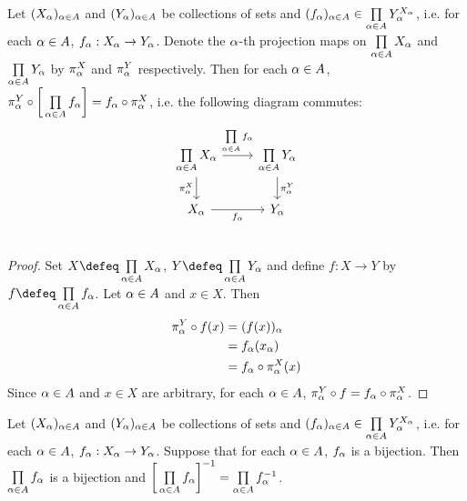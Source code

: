 \documentclass{book}
\begin{document}
	\begin{ex}  
		Let $(X_{\alpha})_{\alpha \in A}$ and $(Y_{\alpha})_{\alpha \in A}$ be collections of sets and $(f_{\alpha})_{\alpha \in A} \in \prod\limits_{\alpha \in A} Y_{\alpha}^{X_{\alpha}}$, i.e. for each $\alpha \in A$, $f_{\alpha}:X_{\alpha} \rightarrow Y_{\alpha}$. Denote the $\alpha$-th projection maps on $\prod\limits_{\alpha \in A} X_{\alpha}$ and $\prod\limits_{\alpha \in A} Y_{\alpha}$ by $\pi^X_{\alpha}$ and $\pi^Y_{\alpha}$ respectively. Then for each $\alpha \in A$, $\pi^Y_{\alpha} \circ \bigg[ \prod\limits_{\alpha \in A} f_{\alpha} \bigg]  = f_{\alpha} \circ \pi^X_{\alpha}$, i.e. the following diagram commutes:
		\[ 
		\begin{tikzcd}
			\prod\limits_{\al \in A} X_{\al}  \arrow[r, "\prod\limits_{\al \in A} f_{\al}"]  \arrow[d, "\pi^X_{\al}"'] & \prod\limits_{\al \in A} Y_{\al} \arrow[d, "\pi^Y_{\al}"]\\
			X_{\al} \arrow[r, "f_{\al}"'] &  Y_{\al} \\
		\end{tikzcd}
		\]
	\end{ex}
	
	\begin{proof}
		Set $X \defeq \prod\limits_{\al \in A} X_{\al}$, $Y \defeq \prod\limits_{\al \in A}Y_{\al}$ and define $f: X \rightarrow Y$ by $f \defeq \prod\limits_{\al \in A} f_{\al}$. Let $\alpha \in A$ and $x \in X$. Then
		\begin{align*}
			\pi^Y_{\alpha} \circ f(x) 
			& = (f(x))_{\alpha} \\
			& = f_{\alpha}(x_{\alpha}) \\
			& = f_{\alpha} \circ \pi^X_{\alpha}(x) 
		\end{align*}
		Since $\alpha \in A$ and $x \in X$ are arbitrary, for each $\alpha \in A$, $\pi^Y_{\alpha} \circ f = f_{\alpha} \circ \pi^X_{\alpha}$.
	\end{proof}

	\begin{ex}  
		Let $(X_{\alpha})_{\alpha \in A}$ and $(Y_{\alpha})_{\alpha \in A}$ be collections of sets and $(f_{\alpha})_{\alpha \in A} \in \prod\limits_{\alpha \in A} Y_{\alpha}^{X_{\alpha}}$, i.e. for each $\alpha \in A$, $f_{\alpha}:X_{\alpha} \rightarrow Y_{\alpha}$. Suppose that for each $\alpha \in A$, $f_{\alpha}$ is a bijection. Then $\prod\limits_{\alpha \in A} f_{\alpha}$ is a bijection and $\bigg[ \prod\limits_{\alpha \in A} f_{\alpha} \bigg]^{-1} = \prod\limits_{\alpha \in A} f_{\alpha}^{-1}$.
	\end{ex}
	
\end{document}
